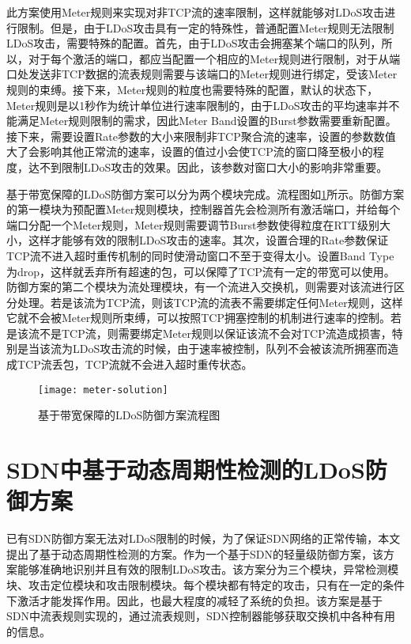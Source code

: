 此方案使用Meter规则来实现对非TCP流的速率限制，这样就能够对LDoS攻击进行限制。但是，由于LDoS攻击具有一定的特殊性，普通配置Meter规则无法限制LDoS攻击，需要特殊的配置。首先，由于LDoS攻击会拥塞某个端口的队列，所以，对于每个激活的端口，都应当配置一个相应的Meter规则进行限制，对于从端口处发送非TCP数据的流表规则需要与该端口的Meter规则进行绑定，受该Meter规则的束缚。接下来，Meter规则的粒度也需要特殊的配置，默认的状态下，Meter规则是以1秒作为统计单位进行速率限制的，由于LDoS攻击的平均速率并不能满足Meter规则限制的需求，因此Meter Band设置的Burst参数需要重新配置。接下来，需要设置Rate参数的大小来限制非TCP聚合流的速率，设置的参数数值大了会影响其他正常流的速率，设置的值过小会使TCP流的窗口降至极小的程度，达不到限制LDoS攻击的效果。因此，该参数对窗口大小的影响非常重要。


基于带宽保障的LDoS防御方案可以分为两个模块完成。流程图如\ref{fig:meter-solution}所示。防御方案的第一模块为预配置Meter规则模块，控制器首先会检测所有激活端口，并给每个端口分配一个Meter规则，Meter规则需要调节Burst参数使得粒度在RTT级别大小，这样才能够有效的限制LDoS攻击的速率。其次，设置合理的Rate参数保证TCP流不进入超时重传机制的同时使滑动窗口不至于变得太小。设置Band Type为drop，这样就丢弃所有超速的包，可以保障了TCP流有一定的带宽可以使用。防御方案的第二个模块为流处理模块，有一个流进入交换机，则需要对该流进行区分处理。若是该流为TCP流，则该TCP流的流表不需要绑定任何Meter规则，这样它就不会被Meter规则所束缚，可以按照TCP拥塞控制的机制进行速率的控制。若是该流不是TCP流，则需要绑定Meter规则以保证该流不会对TCP流造成损害，特别是当该流为LDoS攻击流的时候，由于速率被控制，队列不会被该流所拥塞而造成TCP流丢包，TCP流就不会进入超时重传状态。



\begin{figure}
    \centering
    \texttt{[image: meter-solution]}
    \caption{基于带宽保障的LDoS防御方案流程图}
    \label{fig:meter-solution}
\end{figure}


\section{SDN中基于动态周期性检测的LDoS防御方案}
\label{chap4:SoftGuard}
已有SDN防御方案无法对LDoS限制的时候，为了保证SDN网络的正常传输，本文提出了基于动态周期性检测的方案。作为一个基于SDN的轻量级防御方案，该方案能够准确地识别并且有效的限制LDoS攻击。该方案分为三个模块，异常检测模块、攻击定位模块和攻击限制模块。每个模块都有特定的攻击，只有在一定的条件下激活才能发挥作用。因此，也最大程度的减轻了系统的负担。该方案是基于SDN中流表规则实现的，通过流表规则，SDN控制器能够获取交换机中各种有用的信息。

